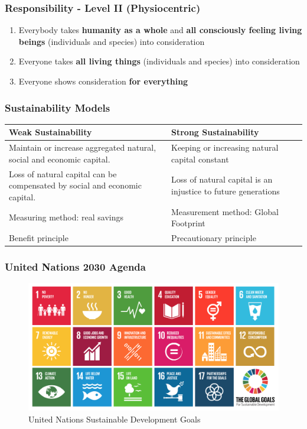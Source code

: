 \documentclass[11pt]{article}
\theoremstyle{definition}
\begin{document}
\subsubsection{Responsibility - Level II (Physiocentric)}
\begin{enumerate}
	\item Everybody takes \textbf{humanity as a whole} and \textbf{all consciously feeling living beings} (individuals and species) into consideration
	\item Everyone takes \textbf{all living things} (individuals and species) into consideration
	\item Everyone shows consideration \textbf{for everything}
\end{enumerate}

\clearpage
\subsubsection{Sustainability Models}
\begin{tabularx}{\linewidth}{|X|X|}
	\hline
	\textbf{Weak Sustainability} & \textbf{Strong Sustainability}\\
	\hline
	Maintain or increase aggregated natural, social and economic capital. & Keeping or increasing natural capital constant \\
	\hline
	Loss of natural capital can be compensated by social and economic capital. & Loss of natural capital is an injustice to future generations \\
	\hline
	Measuring method: real savings & Measurement method: Global Footprint \\
	\hline
	Benefit principle & Precautionary principle \\
	\hline
\end{tabularx}

\subsubsection{United Nations 2030 Agenda}
\begin{figure}[H]
	\centering
	\includegraphics[width=0.9\linewidth]{img/sustainable_development_goals}
	\caption{United Nations Sustainable Development Goals}
	\label{fig:sustainabledevelopmentgoals}
\end{figure}
\end{document}
